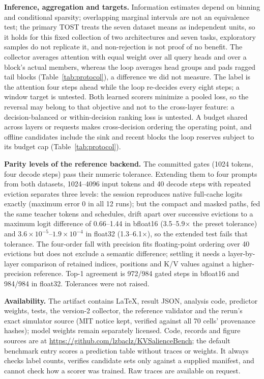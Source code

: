 \textbf{Inference, aggregation and targets.} Information estimates depend on binning and
conditional sparsity; overlapping marginal intervals are not an equivalence test; the
primary TOST treats the seven dataset means as independent units, so it holds for this
fixed collection of two architectures and seven tasks, exploratory samples do not
replicate it, and non-rejection is not proof of no benefit. The collector averages
attention with equal weight over all query heads and over a block's actual members,
whereas the loop averages head groups and pads ragged tail blocks
(Table~\ref{tab:protocol}), a difference we did not measure. The label is the attention
four steps ahead while the loop re-decides every eight steps; a window target is
untested. Both learned scorers minimize a pooled loss, so the reversal may belong to
that objective and not to the cross-layer feature: a decision-balanced or
within-decision ranking loss is untested. A budget shared across layers or requests
makes cross-decision ordering the operating point, and offline candidates include the
sink and recent blocks the loop reserves subject to its budget cap
(Table~\ref{tab:protocol}).

\textbf{Parity levels of the reference backend.} The committed gates (1024 tokens, four
decode steps) pass their numeric tolerance. Extending them to four prompts from both
datasets, 1024--4096 input tokens and 40 decode steps with repeated eviction separates
three levels: the session reproduces native full-cache logits exactly (maximum error 0
in all 12 runs); but the compact and masked paths, fed the same teacher tokens and
schedules, drift apart over successive evictions to a maximum logit difference of
0.66--1.44 in bfloat16 (3.5--5.9$\times$ the preset tolerance) and
$3.6\times10^{-5}$--$1.9\times10^{-4}$ in float32 (1.3--6.1$\times$), so the extended
test fails that tolerance. The four-order fall with precision fits floating-point
ordering over 40 evictions but does not exclude a semantic difference; settling it needs
a layer-by-layer comparison of retained indices, positions and K/V values against a
higher-precision reference. Top-1 agreement is 972/984 gated steps in bfloat16 and 984/984 in float32.
Tolerances were not raised.

\textbf{Availability.} The artifact contains LaTeX, result JSON, analysis code,
predictor weights, tests, the version-2 collector, the reference validator and the
rerun's exact simulator source (MIT notice kept, verified against all 70 cells'
provenance hashes); model weights remain separately licensed. Code, records and figure sources are at
\url{https://github.com/lzbaclz/KVSalienceBench}; the default benchmark entry scores a
prediction table without traces or weights. It always checks label counts, verifies
candidate sets only against a supplied manifest, and cannot check how a scorer was
trained. Raw traces are available on request.
